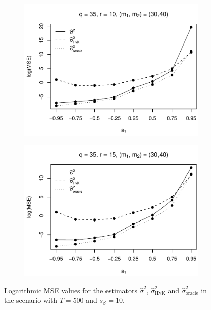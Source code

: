 \begin{figure}[p]
\begin{subfigure}[b]{0.45\textwidth}
\includegraphics[width=\textwidth]{Plots/Robustness/MSE_lrv_T=500_slope=10_(q,K1,K2,M1,M2)=(35,2,10,30,40).pdf}
\end{subfigure}
\hspace{0.25cm}
\begin{subfigure}[b]{0.45\textwidth}
\includegraphics[width=\textwidth]{Plots/Robustness/MSE_lrv_T=500_slope=10_(q,K1,K2,M1,M2)=(35,2,15,30,40).pdf}
\end{subfigure}
\caption{Logarithmic MSE values for the estimators $\widehat{\sigma}^2$, $\widehat{\sigma}^2_{\text{HvK}}$ and $\widehat{\sigma}^2_{\text{oracle}}$ in the scenario with $T=500$ and $s_\beta=10$.}\label{fig:MSE_slope10_lrv_robust} 
\end{figure}


